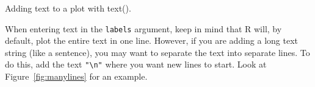 \documentclass{tufte-book}\usepackage[]{graphicx}\usepackage[]{color}
\makeatletter
\def\maxwidth{ %
  \ifdim\Gin@nat@width>\linewidth
    \linewidth
  \else
    \Gin@nat@width
  \fi
}
\newcommand{\hlnum}[1]{\textcolor[rgb]{0.686,0.059,0.569}{#1}}%
\newcommand{\hlcom}[1]{\textcolor[rgb]{0.678,0.584,0.686}{\textit{#1}}}%
\newcommand{\hlstd}[1]{\textcolor[rgb]{0.345,0.345,0.345}{#1}}%
\newcommand{\hlkwc}[1]{\textcolor[rgb]{0.333,0.667,0.333}{#1}}%
\newcommand{\hlkwd}[1]{\textcolor[rgb]{0.737,0.353,0.396}{\textbf{#1}}}%
\newenvironment{kframe}{%
 \def\at@end@of@kframe{}%
 \ifinner\ifhmode%
  \def\at@end@of@kframe{\end{minipage}}%
  \begin{minipage}{\columnwidth}%
 \fi\fi%
 \def\FrameCommand##1{\hskip\@totalleftmargin \hskip-\fboxsep
 \colorbox{shadecolor}{##1}\hskip-\fboxsep
     \hskip-\linewidth \hskip-\@totalleftmargin \hskip\columnwidth}%
 \MakeFramed {\advance\hsize-\width
   \@totalleftmargin\z@ \linewidth\hsize
   \@setminipage}}%
 {\par\unskip\endMakeFramed%
 \at@end@of@kframe}
\newenvironment{knitrout}{}{} %
\makeatother
\begin{document}
\begin{marginfigure}
\caption{Adding text to a plot with text().}
\label{fig:textexample}
\end{marginfigure}

When entering text in the \texttt{labels} argument, keep in mind that R will, by default, plot the entire text in one line. However, if you are adding a long text string (like a sentence), you may want to separate the text into separate lines. To do this, add the text \texttt{"\textbackslash n"} where you want new lines to start. Look at Figure~\ref{fig:manylines} for an example.
\end{document}
